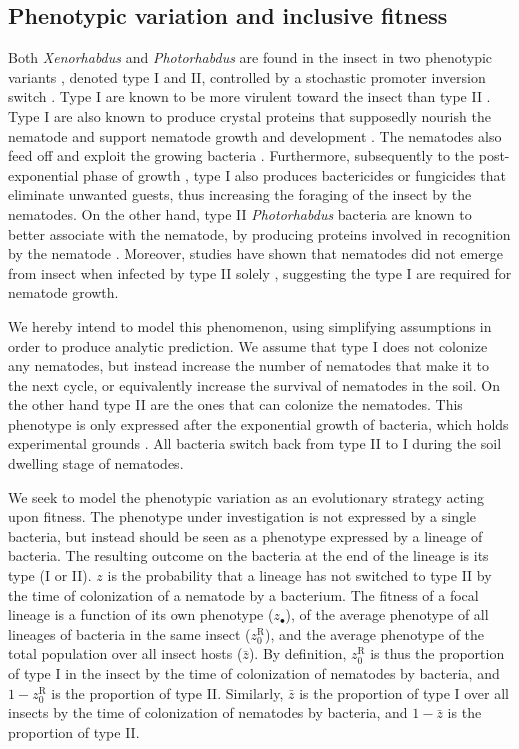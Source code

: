\documentclass[10pt]{article}
\newcommand{\Xeno}{\textit{Xenorhabdus} }
\newcommand{\Photo}{\textit{Photorhabdus} }
\begin{document}
\begin{multicols}{2}
\section*{Phenotypic variation and inclusive fitness}

Both \Xeno and \Photo are found in the insect in two phenotypic variants \cite{Akhurst1982a,Forst1997}, denoted type I and II, controlled by a stochastic promoter inversion switch \cite{Somvanshi2012}.
Type I are known to be more virulent toward the insect than type II \cite{Volgyi,Givaudan2000}.
Type I are also known to produce crystal proteins \cite{Ciche2006,bintrim1998insertional} that supposedly nourish the nematode and support nematode growth and development \cite{Somvanshi2012}.
The nematodes also feed off and exploit the growing bacteria \cite{Waterfield2009}.
Furthermore, subsequently to the post-exponential phase of growth \cite{clarke1995virulence}, type I also produces bactericides \cite{Ji2004,Gualtieri2009} or fungicides that eliminate unwanted guests, thus increasing the foraging of the insect by the nematodes.
On the other hand, type II \Photo bacteria are known to better associate with the nematode, by producing proteins involved in recognition by the nematode \cite{Somvanshi2010,Heungens2002}.
Moreover, studies have shown that nematodes did not emerge from insect when infected by type II solely \cite{Sugar2012,Somvanshi2012}, suggesting the type I are required for nematode growth.

We hereby intend to model this phenomenon, using simplifying assumptions in order to produce analytic prediction. %
We assume that type I does not colonize any nematodes, but instead increase the number of nematodes that make it to the next cycle, or equivalently increase the survival of nematodes in the soil.
On the other hand type II are the ones that can colonize the nematodes.
This phenotype is only expressed after the exponential growth of bacteria, which holds experimental grounds \cite{Somvanshi2012}.
All bacteria switch back from type II to I during the soil dwelling stage of nematodes.

We seek to model the phenotypic variation as an evolutionary strategy acting upon fitness.
The phenotype under investigation is not expressed by a single bacteria, but instead should be seen as a phenotype expressed by a lineage of bacteria.
The resulting outcome on the bacteria at the end of the lineage is its type (I or II). $z$ is the probability that a lineage has not switched to type II by the time of colonization of a nematode by a bacterium.
The fitness of a focal lineage is a function of its own phenotype ($z_\bullet$), of the average phenotype of all lineages of bacteria in the same insect ($z_0^{\mathrm{R}}$), and the average phenotype of the total population over all insect hosts ($\bar{z}$).
By definition, $z_0^{\mathrm{R}}$ is thus the proportion of type I in the insect by the time of colonization of nematodes by bacteria, and $1-z_0^{\mathrm{R}}$ is the proportion of type II.
Similarly, $\bar{z}$ is the proportion of type I over all insects by the time of colonization of nematodes by bacteria, and $1-\bar{z}$ is the proportion of type II.


\end{multicols}
\end{document}
